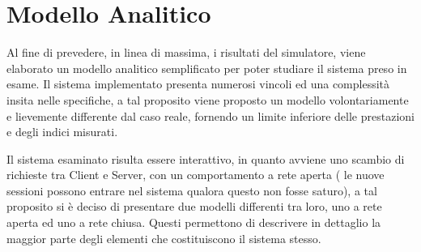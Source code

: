 \section{Modello Analitico}
Al fine di prevedere, in linea di massima, i risultati del simulatore, viene elaborato un modello  analitico semplificato per poter studiare il sistema preso in esame.
Il sistema implementato presenta numerosi vincoli ed una complessità insita nelle specifiche, a tal proposito viene proposto un modello volontariamente e lievemente differente dal caso reale, fornendo un limite inferiore delle prestazioni e degli indici misurati.

Il sistema esaminato risulta essere interattivo, in quanto avviene uno scambio di richieste tra Client e Server, con un comportamento a rete aperta ( le nuove sessioni possono entrare nel sistema qualora questo non fosse saturo), a tal proposito si è deciso di presentare due modelli differenti tra loro, uno a rete aperta ed uno a rete chiusa. Questi permettono di descrivere in dettaglio la maggior parte degli elementi che costituiscono il sistema stesso.

